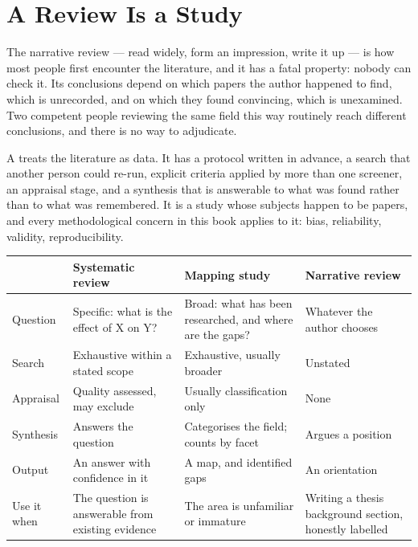 \section{A Review Is a Study}

The narrative review --- read widely, form an impression, write it up --- is
how most people first encounter the literature, and it has a fatal property:
nobody can check it. Its conclusions depend on which papers the author happened
to find, which is unrecorded, and on which they found convincing, which is
unexamined. Two competent people reviewing the same field this way routinely
reach different conclusions, and there is no way to adjudicate.

A  treats the literature as data. It has a protocol
written in advance, a search that another person could re-run, explicit
criteria applied by more than one screener, an appraisal stage, and a synthesis
that is answerable to what was found rather than to what was remembered. It is
a study whose subjects happen to be papers, and every methodological concern in
this book applies to it: bias, reliability, validity, reproducibility.

\begin{center}
\small
\begin{tabular}{@{}L{2.6cm}L{3.7cm}L{3.7cm}L{3.4cm}@{}}
\toprule
 & \textbf{Systematic review} & \textbf{Mapping study} & \textbf{Narrative review} \\
\midrule
Question    & Specific: what is the effect of X on Y?
            & Broad: what has been researched, and where are the gaps?
            & Whatever the author chooses \\
Search      & Exhaustive within a stated scope
            & Exhaustive, usually broader
            & Unstated \\
Appraisal   & Quality assessed, may exclude
            & Usually classification only
            & None \\
Synthesis   & Answers the question
            & Categorises the field; counts by facet
            & Argues a position \\
Output      & An answer with confidence in it
            & A map, and identified gaps
            & An orientation \\
Use it when & The question is answerable from existing evidence
            & The area is unfamiliar or immature
            & Writing a thesis background section, honestly labelled \\
\bottomrule
\end{tabular}
\end{center}

